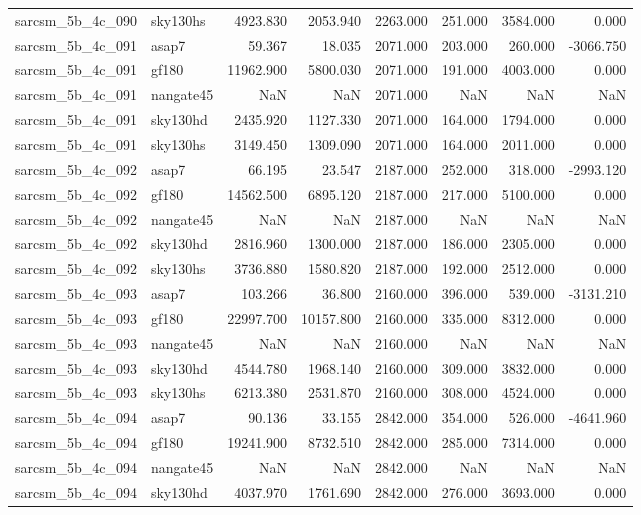 \begin{tabular}{llrrrrrr}
sarcsm\_5b\_4c\_090 & sky130hs & 4923.830 & 2053.940 & 2263.000 & 251.000 & 3584.000 & 0.000 \\
sarcsm\_5b\_4c\_091 & asap7 & 59.367 & 18.035 & 2071.000 & 203.000 & 260.000 & -3066.750 \\
sarcsm\_5b\_4c\_091 & gf180 & 11962.900 & 5800.030 & 2071.000 & 191.000 & 4003.000 & 0.000 \\
sarcsm\_5b\_4c\_091 & nangate45 & NaN & NaN & 2071.000 & NaN & NaN & NaN \\
sarcsm\_5b\_4c\_091 & sky130hd & 2435.920 & 1127.330 & 2071.000 & 164.000 & 1794.000 & 0.000 \\
sarcsm\_5b\_4c\_091 & sky130hs & 3149.450 & 1309.090 & 2071.000 & 164.000 & 2011.000 & 0.000 \\
sarcsm\_5b\_4c\_092 & asap7 & 66.195 & 23.547 & 2187.000 & 252.000 & 318.000 & -2993.120 \\
sarcsm\_5b\_4c\_092 & gf180 & 14562.500 & 6895.120 & 2187.000 & 217.000 & 5100.000 & 0.000 \\
sarcsm\_5b\_4c\_092 & nangate45 & NaN & NaN & 2187.000 & NaN & NaN & NaN \\
sarcsm\_5b\_4c\_092 & sky130hd & 2816.960 & 1300.000 & 2187.000 & 186.000 & 2305.000 & 0.000 \\
sarcsm\_5b\_4c\_092 & sky130hs & 3736.880 & 1580.820 & 2187.000 & 192.000 & 2512.000 & 0.000 \\
sarcsm\_5b\_4c\_093 & asap7 & 103.266 & 36.800 & 2160.000 & 396.000 & 539.000 & -3131.210 \\
sarcsm\_5b\_4c\_093 & gf180 & 22997.700 & 10157.800 & 2160.000 & 335.000 & 8312.000 & 0.000 \\
sarcsm\_5b\_4c\_093 & nangate45 & NaN & NaN & 2160.000 & NaN & NaN & NaN \\
sarcsm\_5b\_4c\_093 & sky130hd & 4544.780 & 1968.140 & 2160.000 & 309.000 & 3832.000 & 0.000 \\
sarcsm\_5b\_4c\_093 & sky130hs & 6213.380 & 2531.870 & 2160.000 & 308.000 & 4524.000 & 0.000 \\
sarcsm\_5b\_4c\_094 & asap7 & 90.136 & 33.155 & 2842.000 & 354.000 & 526.000 & -4641.960 \\
sarcsm\_5b\_4c\_094 & gf180 & 19241.900 & 8732.510 & 2842.000 & 285.000 & 7314.000 & 0.000 \\
sarcsm\_5b\_4c\_094 & nangate45 & NaN & NaN & 2842.000 & NaN & NaN & NaN \\
sarcsm\_5b\_4c\_094 & sky130hd & 4037.970 & 1761.690 & 2842.000 & 276.000 & 3693.000 & 0.000 \\

\end{tabular}
